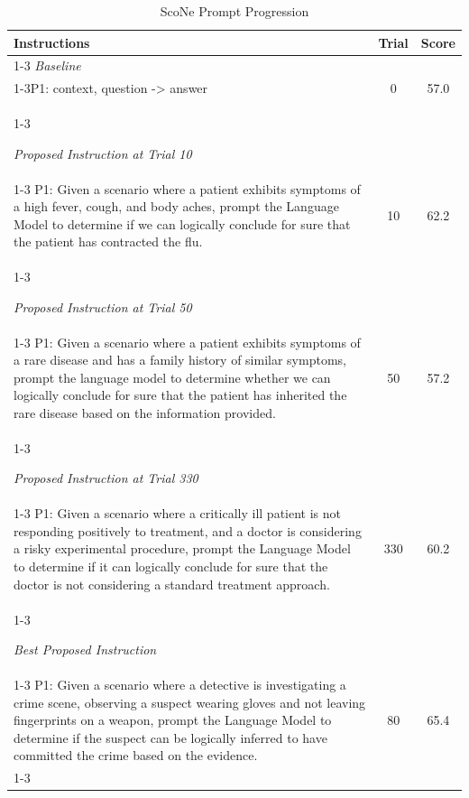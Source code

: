 \begin{table}[ht]
\centering
\footnotesize
\begin{tabularx}{\textwidth}{Xcc}
\hline
\textbf{Instructions} & \textbf{Trial} & \textbf{Score} \\ \hline
\cline{1-3}
\textit{Baseline} \\
\cline{1-3}P1: context, question -> answer & \multirow{1}{*}{0} & \multirow{1}{*}{57.0} \\
\cline{1-3}

\textit{Proposed Instruction at Trial 10} \\
\cline{1-3}
P1: Given a scenario where a patient exhibits symptoms of a high fever, cough, and body aches, prompt the Language Model to determine if we can logically conclude for sure that the patient has contracted the flu. & \multirow{1}{*}{10} & \multirow{1}{*}{62.2} \\
\cline{1-3}

\textit{Proposed Instruction at Trial 50} \\
\cline{1-3}
P1: Given a scenario where a patient exhibits symptoms of a rare disease and has a family history of similar symptoms, prompt the language model to determine whether we can logically conclude for sure that the patient has inherited the rare disease based on the information provided. & \multirow{1}{*}{50} & \multirow{1}{*}{57.2} \\
\cline{1-3}

\textit{Proposed Instruction at Trial 330} \\
\cline{1-3}
P1: Given a scenario where a critically ill patient is not responding positively to treatment, and a doctor is considering a risky experimental procedure, prompt the Language Model to determine if it can logically conclude for sure that the doctor is not considering a standard treatment approach. & \multirow{1}{*}{330} & \multirow{1}{*}{60.2} \\
\cline{1-3}

\textit{Best Proposed Instruction} \\
\cline{1-3}
P1: Given a scenario where a detective is investigating a crime scene, observing a suspect wearing gloves and not leaving fingerprints on a weapon, prompt the Language Model to determine if the suspect can be logically inferred to have committed the crime based on the evidence. & \multirow{1}{*}{80} & \multirow{1}{*}{65.4} \\
\cline{1-3}

\hline
\end{tabularx}
\caption{ScoNe Prompt Progression}
\label{table:ScoNe_prompt_progression}
\end{table}

